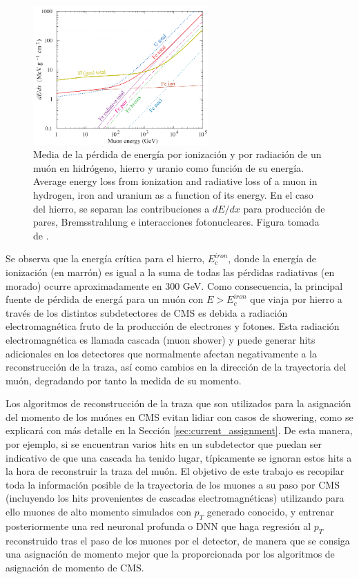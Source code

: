 \begin{figure}
\centering
\includegraphics[width=0.60\textwidth]{figures/dEdx.png}
\caption{Media de la p\'erdida de energ\'ia por ionizaci\'on y por radiaci\'on de un mu\'on en hidr\'ogeno, hierro y uranio como funci\'on de su energ\'ia.  Average energy loss from ionization and radiative loss of a muon in hydrogen, iron and uranium as a function of its energy. En el caso del hierro, se separan las contribuciones a $dE/dx$ para producci\'on de pares, Bremsstrahlung e interacciones fotonucleares. Figura tomada de \cite{Tanabashi:2018oca}.}
\label{fig:dEdX}        
\end{figure}

Se observa que la energ\'ia cr\'itica para el hierro, $E^{iron}_{c}$, donde la energ\'ia de ionizaci\'on (en marr\'on) es igual a la suma de todas las p\'erdidas radiativas (en morado) ocurre aproximadamente en 300 GeV. Como consecuencia, la principal fuente de p\'erdida de energ\'a para un mu\'on con $E>E^{iron}_{c}$ que viaja por hierro a trav\'es de los distintos subdetectores de CMS es debida a radiaci\'on electromagn\'etica fruto de la producci\'on de electrones y fotones. Esta radiaci\'on electromagn\'etica es llamada cascada (muon shower) y puede generar hits adicionales en los detectores que normalmente afectan negativamente a la reconstrucci\'on de la traza, as\'i como cambios en la direcci\'on de la trayectoria del mu\'on, degradando por tanto la medida de su momento.

Los algoritmos de reconstrucci\'on de la traza que son utilizados para la asignaci\'on del momento de los mu\'ones en CMS evitan lidiar con casos de showering, como se explicar\'a con m\'as detalle en la Secci\'on \ref{sec:current_assignment}. De esta manera, por ejemplo, si se encuentran varios hits en un subdetector que puedan ser indicativo de que una cascada ha tenido lugar, t\'ipicamente se ignoran estos hits a la hora de reconstruir la traza del mu\'on. El objetivo de este trabajo es recopilar toda la informaci\'on posible de la trayectoria de los muones a su paso por CMS (incluyendo los hits provenientes de cascadas electromagn\'eticas) utilizando para ello muones de alto momento simulados con $p_{T}$ generado conocido, y entrenar posteriormente una red neuronal profunda o DNN que haga regresi\'on al $p_{T}$ reconstruido tras el paso de los muones por el detector, de manera que se consiga una asignaci\'on de momento mejor que la proporcionada por los algoritmos de asignaci\'on de momento de CMS.

